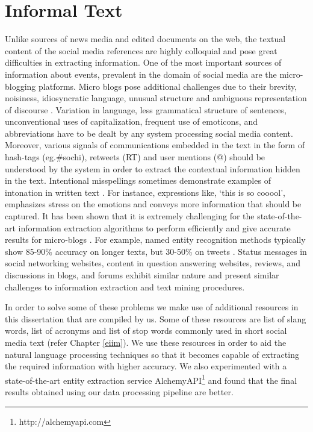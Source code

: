\section{Informal Text}
Unlike sources of news media and edited documents on the web, the textual content of the social media references are highly colloquial and pose great difficulties in extracting information. One of the most important sources of information about events, prevalent in the domain of social media are the micro-blogging platforms. Micro blogs pose additional challenges due to their brevity, noisiness, idiosyncratic language, unusual structure and ambiguous representation of discourse \cite{bontcheva2013twitie}. Variation in language, less grammatical structure of sentences, unconventional uses of capitalization, frequent use of emoticons, and abbreviations have to be dealt by any system processing social media content. Moreover, various signals of communications embedded in the text in the form of hash-tags (eg.\#sochi), retweets (RT) and user mentions (@) should be understood by the system in order to extract the contextual information hidden in the text. Intentional misspellings sometimes demonstrate examples of intonation in written text \cite{prevost1996information}. For instance, expressions like, `this is so cooool', emphasizes stress on the emotions and conveys more information that should be captured. It has been shown that it is extremely challenging for the state-of-the-art information extraction algorithms to perform efficiently and give accurate results for micro-blogs \cite{derczynski2013microblog}. For example, named entity recognition methods typically show 85-90\% accuracy on longer texts, but 30-50\% on tweets \cite{ritter2011named}. Status messages in social networking websites, content in question answering websites, reviews, and discussions in blogs, and forums exhibit similar nature and present similar challenges to information extraction and text mining procedures.

In order to solve some of these problems we make use of additional resources in this dissertation that are compiled by us. Some of these resources are list of slang words, list of acronyms and list of stop words commonly used in short social media text (refer Chapter \ref{eiim}). We use these resources in order to aid the natural language processing techniques so that it becomes capable of extracting the required information with higher accuracy. We also experimented with a state-of-the-art entity extraction service AlchemyAPI\footnote{http://alchemyapi.com} and found that the final results obtained using our data processing pipeline are better.



